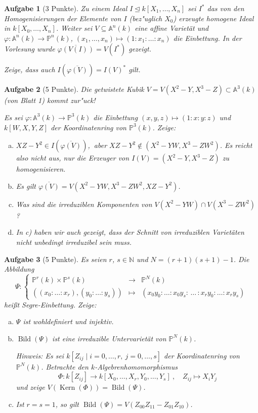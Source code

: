 \documentclass[a4paper, 12pt, numbers=noendperiod, chapterprefix=true, headsepline]{scrbook}
\theoremstyle{break}
\newtheorem{Aufg}{Aufgabe}
\theoremstyle{nonumberbreak}
\theoremstyle{nonumberplain}
\DeclareMathOperator{\Bild}{Bild}
\DeclareMathOperator{\Kern}{Kern}
\newcommand{\N}{\mathbb{N}}
\newcommand{\A}{\mathbb{A}}
\newcommand{\IP}{\mathbb{P}}%
\newcommand{\ideal}{\unlhd}
\begin{document}
\begin{Aufg}[3 Punkte]
Zu einem Ideal $I\ideal k[X_1,\dots,X_n]$ sei $I^*$ das von den Homogenisierungen der Elemente von $I$ (bez"uglich $X_0$) erzeugte homogene Ideal in $k[X_0,\dots,X_n]$. Weiter sei $V\subseteq \A^n(k)$ eine affine Variet\"at und $\varphi: \A^n(k)\to \IP^n(k)$, $(x_1,\dots,x_n)\mapsto (1:x_1:\ldots:x_n)$ die Einbettung. In der Vorlesung wurde $\overline{\varphi(V(I))} = V(I^*)$ gezeigt.

Zeige, dass auch $I(\overline{\varphi(V)}) = I(V)^*$ gilt.
\end{Aufg}

\begin{Aufg}[5 Punkte]
Die getwistete Kubik $V = V(X^2-Y, X^3-Z) \subset \A^3(k)$ (von Blatt 1) kommt zur"uck! 

Es sei $\varphi: \A^3(k)\to \IP^3(k)$ die Einbettung $(x,y,z)\mapsto (1:x:y:z)$ und $k[W,X,Y,Z]$ der Koordinatenring von $\IP^3(k)$. Zeige:
\begin{enumerate}[a)]
	\item $XZ-Y^2 \in I(\overline{\varphi(V)})$,$\ $ aber $XZ-Y^2\not\in (X^2-YW, X^3-ZW^2)$. Es reicht also nicht aus, nur die Erzeuger von $I(V) = (X^2-Y, X^3-Z)$ zu homogenisieren.
	\item Es gilt $\overline{\varphi(V)} = V(X^2 - YW, X^3-ZW^2, XZ-Y^2)$.
	\item Was sind die irreduziblen Komponenten von $V(X^2 -YW) \cap V(X^3-ZW^2)$?
	\item In c) haben wir auch gezeigt, dass der Schnitt von irreduziblen Variet\"aten nicht unbedingt irreduzibel sein muss.
\end{enumerate}\end{Aufg}

\begin{Aufg}[5 Punkte]
Es seien $r$, $s\in \N$ und $N= (r+1)(s+1) - 1$. Die Abbildung
	\[\Psi: \left\{ \begin{array}{ccc} \IP^r(k)\times \IP^s(k) &\to& \IP^N(k)\\
		((x_0:\ldots:x_r),(y_0:\ldots:y_s)) &\mapsto& (x_0y_0:\ldots:x_0y_s:\, \ldots\, : x_ry_0: \ldots :x_ry_s ) 
		\end{array}
	\right.\]
hei\ss t \textit{Segre-Einbettung}. Zeige:
\begin{enumerate}[a)]
	\item $\Psi$ ist wohldefiniert und injektiv.
	\item $\Bild(\Psi)$ ist eine irreduzible Untervariet\"at von $\IP^N(k)$.
 
	\emph{Hinweis: Es sei $k[Z_{ij}\mid i=0,\dots,r,\ j=0,\dots,s]$ der Koordinatenring von $\IP^N(k)$. Betrachte den $k$-Algebrenhomomorphismus
		\[\Phi:k[Z_{ij}]\to k[X_0,\dots,X_r,Y_0,\dots,Y_s]\ ,\quad Z_{ij}\mapsto X_iY_j\]
	und zeige $V(\Kern(\Phi)) = \Bild(\Psi)$.}
	\item Ist $r=s=1$, so gilt $\Bild(\Psi) = V(Z_{00}Z_{11}-Z_{01}Z_{10})$.
\end{enumerate}\end{Aufg}
\end{document}
